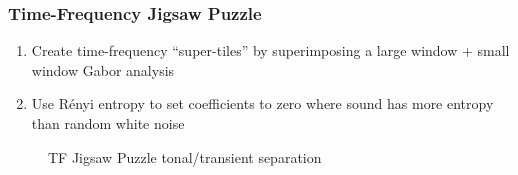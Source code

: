 \documentclass[usenames,dvipsnames]{beamer}
\begin{document}
\begin{frame}
	\frametitle{Time-Frequency Jigsaw Puzzle}
	\begin{enumerate}
		\item
			Create time-frequency ``super-tiles'' by superimposing a large window + small window Gabor analysis
		\item
			Use R{\'e}nyi entropy to set coefficients to zero where sound has more entropy than random white noise
	\end{enumerate}
	\begin{figure}[ht]
		\vspace{-0.75em}
		\hspace{0.1em}
		\caption{TF Jigsaw Puzzle tonal/transient separation}
	\end{figure}
\end{frame}

\end{document}
